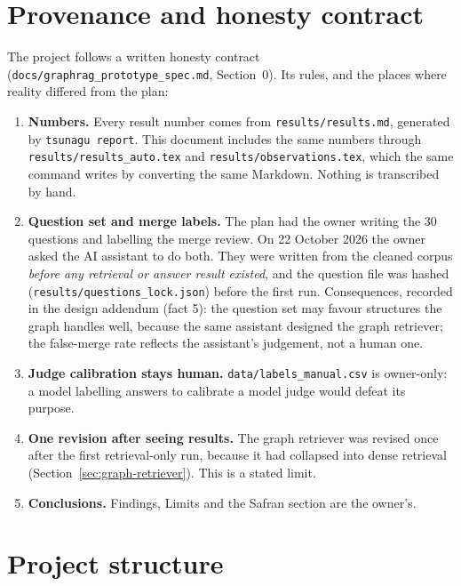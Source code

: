 \documentclass[11pt,a4paper]{article}
\newcommand{\code}[1]{\texttt{#1}}
\begin{document}
\section{Provenance and honesty contract}

The project follows a written honesty contract (\code{docs/graphrag\_prototype\_spec.md},
Section~0). Its rules, and the places where reality differed from the plan:

\begin{enumerate}
  \item \textbf{Numbers.} Every result number comes from \code{results/results.md}, generated
  by \code{tsunagu report}. This document includes the same numbers through
  \code{results/results\_auto.tex} and \code{results/observations.tex}, which the same command
  writes by converting the same Markdown. Nothing is transcribed by hand.
  \item \textbf{Question set and merge labels.} The plan had the owner writing the 30 questions
  and labelling the merge review. On 22 October 2026 the owner asked the AI assistant to do
  both. They were written from the cleaned corpus \emph{before any retrieval or answer result
  existed}, and the question file was hashed (\code{results/questions\_lock.json}) before the
  first run. Consequences, recorded in the design addendum (fact 5): the question set may
  favour structures the graph handles well, because the same assistant designed the graph
  retriever; the false-merge rate reflects the assistant's judgement, not a human one.
  \item \textbf{Judge calibration stays human.} \code{data/labels\_manual.csv} is owner-only:
  a model labelling answers to calibrate a model judge would defeat its purpose.
  \item \textbf{One revision after seeing results.} The graph retriever was revised once after
  the first retrieval-only run, because it had collapsed into dense retrieval
  (Section~\ref{sec:graph-retriever}). This is a stated limit.
  \item \textbf{Conclusions.} Findings, Limits and the Safran section are the owner's.
\end{enumerate}

\section{Project structure}
\end{document}
